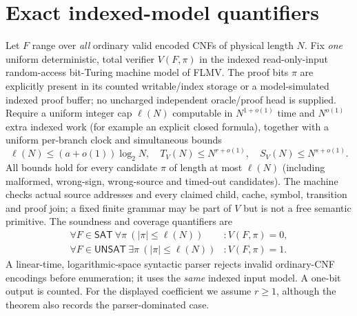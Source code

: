 \documentclass[11pt]{article}
\newcommand{\SAT}{\mathsf{SAT}}
\newcommand{\UNSAT}{\mathsf{UNSAT}}
\begin{document}
\section{Exact indexed-model quantifiers}
Let $F$ range over \emph{all} ordinary valid encoded CNFs of physical
length $N$. Fix \emph{one} uniform deterministic, total verifier
$V(F,\pi)$ in the indexed read-only-input random-access bit-Turing
machine model of FLMV. The proof bits $\pi$ are explicitly present in
its counted writable/index storage or a model-simulated indexed proof
buffer; no uncharged independent oracle/proof head is supplied.
Require a uniform integer cap $\ell(N)$ computable in $N^{1+o(1)}$
time and $N^{o(1)}$ extra indexed work (for example an explicit
closed formula), together with a uniform per-branch
clock and simultaneous bounds
\[
\ell(N)\le(a+o(1))\log_2N,\quad
T_V(N)\le N^{r+o(1)},\quad
S_V(N)\le N^{s+o(1)}.                                  \tag{1}
\]
All bounds hold for every candidate $\pi$ of length at most $\ell(N)$
(including malformed, wrong-sign, wrong-source and timed-out candidates).
The machine checks actual source addresses and every claimed child,
cache, symbol, transition and proof join; a fixed finite grammar may be
part of $V$ but is not a free semantic primitive. The soundness and
coverage quantifiers are
\[
\begin{split}
 \forall F\in\SAT\ \forall\pi\ (|\pi|\le\ell(N)) &: V(F,\pi)=0,\\
 \forall F\in\UNSAT\ \exists\pi\ (|\pi|\le\ell(N)) &: V(F,\pi)=1.
\end{split}                                                   \tag{2}
\]
A linear-time, logarithmic-space syntactic parser rejects invalid
ordinary-CNF encodings before enumeration; it uses the \emph{same}
indexed input model. A one-bit output is counted. For the displayed
coefficient we assume $r\ge1$, although the theorem also records
the parser-dominated case.
\end{document}
